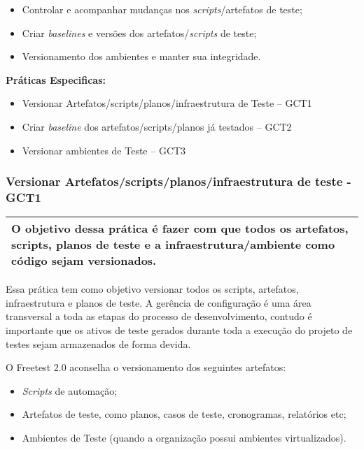 \begin{itemize}
    \item Controlar e acompanhar mudanças nos \textit{scripts}/artefatos de teste;
    \item Criar \textit{baselines} e versões dos artefatos/\textit{scripts} de teste;
    \item Versionamento dos ambientes e manter sua integridade.
\end{itemize}

\textbf{Práticas Especificas: }
\begin{itemize}
    \item Versionar Artefatos/scripts/planos/infraestrutura de Teste – GCT1
    \item Criar \textit{baseline} dos artefatos/scripts/planos já testados – GCT2
    \item Versionar ambientes de Teste – GCT3
\end{itemize}

\subsubsection{ Versionar Artefatos/scripts/planos/infraestrutura de teste - GCT1 }
\label{sec:gct1}

\begin{table}[!ht]
\centering
\begin{tabular}{|p{130mm}|}
\hline
O objetivo dessa prática é fazer com que todos os artefatos, scripts, planos de teste e a infraestrutura/ambiente como código sejam versionados. \\ 
\hline
\end{tabular}
\end{table}

Essa prática tem como objetivo versionar todos os scripts, artefatos, infraestrutura e planos de teste. A gerência de configuração é uma área transversal a toda as etapas do processo de desenvolvimento, contudo é importante que os ativos de teste gerados durante toda a execução do projeto de testes sejam armazenados de forma devida.

O Freetest 2.0 aconselha o versionamento dos seguintes artefatos:

\begin{itemize}
    \item \textit{Scripts} de automação;
    \item Artefatos de teste, como planos, casos de teste, cronogramas, relatórios etc;
    \item Ambientes de Teste (quando a organização possui ambientes virtualizados).
\end{itemize}

